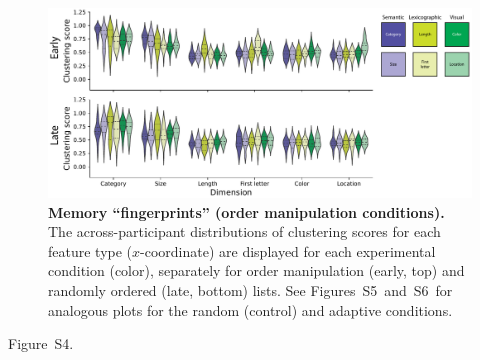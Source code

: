 \documentclass[11pt]{article}
\newcommand{\clusterCorrs}{S4}
\newcommand{\fingerprintsRandom}{S5}
\newcommand{\fingerprintsAdaptive}{S6}
\begin{document}
\begin{figure}[tp] \centering
    \includegraphics[width=\textwidth]{figures/fingerprints}
    
\caption{\textbf{Memory ``fingerprints'' (order manipulation conditions).} The
across-participant distributions of clustering scores for each feature type
($x$-coordinate) are displayed for each experimental condition (color),
separately for order manipulation (early, top) and randomly ordered (late,
bottom) lists. See Figures~\fingerprintsRandom~and~\fingerprintsAdaptive~for
analogous plots for the random (control) and adaptive conditions.}
\label{fig:fingerprints}

\end{figure}

Figure~\clusterCorrs.
\end{document}
